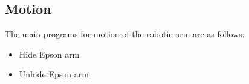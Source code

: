 \subsection{Motion}

The main programs for motion of the robotic arm are as follows:

\begin{itemize}
	\item Hide Epson arm
	
	\item Unhide Epson arm
	
\end{itemize}